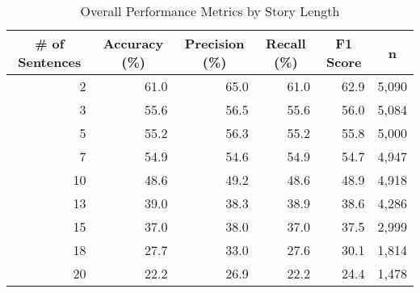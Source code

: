 \begin{table}[htbp]
  \centering
  \caption{Overall Performance Metrics by Story Length}
  \begin{tabular}{rrrrrc}
    \toprule
    \multicolumn{1}{c}{\textbf{\# of Sentences}} & 
    \multicolumn{1}{c}{\textbf{Accuracy (\%)}} & 
    \multicolumn{1}{c}{\textbf{Precision (\%)}} & 
    \multicolumn{1}{c}{\textbf{Recall (\%)}} & 
    \multicolumn{1}{c}{\textbf{F1 Score}} & 
    \multicolumn{1}{c}{\textbf{n}} \\
    \midrule
    2 & 61.0 & 65.0 & 61.0 & 62.9 & 5,090 \\
    3 & 55.6 & 56.5 & 55.6 & 56.0 & 5,084 \\
    5 & 55.2 & 56.3 & 55.2 & 55.8 & 5,000 \\
    7 & 54.9 & 54.6 & 54.9 & 54.7 & 4,947 \\
    10 & 48.6 & 49.2 & 48.6 & 48.9 & 4,918 \\
    13 & 39.0 & 38.3 & 38.9 & 38.6 & 4,286 \\
    15 & 37.0 & 38.0 & 37.0 & 37.5 & 2,999 \\
    18 & 27.7 & 33.0 & 27.6 & 30.1 & 1,814 \\
    20 & 22.2 & 26.9 & 22.2 & 24.4 & 1,478 \\
    \bottomrule
  \end{tabular}
  \label{tab:overall-metrics}
\end{table}
